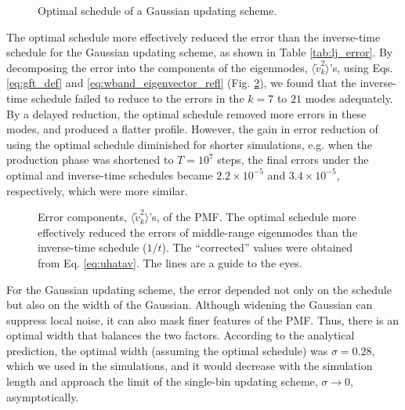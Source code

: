 \documentclass[preprint, superscriptaddress, floatfix]{revtex4-1}
\begin{document}
\begin{figure}[h]\centering
  \caption{
    \label{fig:lj_alpha}
    Optimal schedule of a Gaussian updating scheme.
  }
\end{figure}

The optimal schedule more effectively reduced
the error than the inverse-time schedule
for the Gaussian updating scheme,
as shown in Table \ref{tab:lj_error}.
%
By decomposing the error
into the components of the eigenmodes,
$\langle \tilde v_k^2 \rangle$'s,
using Eqs. \eqref{eq:gft_def} and \eqref{eq:wband_eigenvector_refl}
(Fig. \ref{fig:lj_xerr}),
we found that the inverse-time schedule
failed to reduce to the errors in the $k = 7$ to $21$ modes adequately.
%
By a delayed reduction,
the optimal schedule removed
more errors in these modes,
and produced a flatter profile.
%
However, the gain in error reduction of using the optimal schedule
diminished for shorter simulations,
e.g. when the production phase was shortened to $T = 10^7$ steps,
the final errors under the optimal and inverse-time schedules
became $2.2\times 10^{-5}$ and $3.4\times 10^{-5}$, respectively,
which were more similar.

\begin{figure}[h]\centering
  \caption{
    \label{fig:lj_xerr}
    Error components,
    $\langle \tilde v_k^2 \rangle$'s,
    of the PMF.
    The optimal schedule more effectively
    reduced the errors of middle-range eigenmodes
    than the inverse-time schedule ($1/t$).
    The ``corrected'' values were obtained from
    Eq. \eqref{eq:uhatav}.
    The lines are a guide to the eyes.
  }
\end{figure}


For the Gaussian updating scheme,
the error depended not only on the schedule
but also on the width of the Gaussian.
%
Although widening the Gaussian
can suppress local noise,
it can also mask finer features of the PMF.\cite{laio2005}
%
Thus, there is an optimal width that balances the two factors.
%
According to the analytical prediction,
the optimal width (assuming the optimal schedule)
was $\sigma = 0.28$, which we used in the simulations,
and it would decrease with the simulation length
and approach the limit of the single-bin updating scheme,
$\sigma \to 0$, asymptotically.
\end{document}
